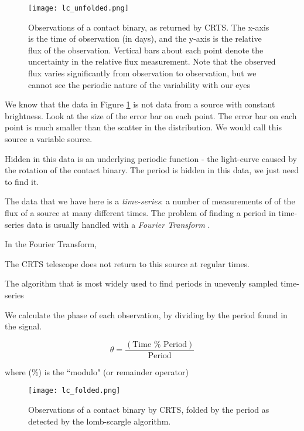 \documentclass[12pt]{article} %
\numberwithin{equation}{section} %
\begin{document}
\begin{figure}[H]
\centering
\texttt{[image: lc\_unfolded.png]}
\caption{Observations of a contact binary, as returned by CRTS. The x-axis is the time of observation (in days), and the y-axis is the relative flux of the observation. Vertical bars about each point denote the uncertainty in the relative flux measurement. Note that the observed flux varies significantly from observation to observation, but we cannot see the periodic nature of the variability with our eyes}
\label{fig: lc_unfolded}
\end{figure}

We know that the data in Figure \ref{fig: lc_unfolded} is not data from a source with constant brightness. Look at the size of the error bar on each point. The error bar on each point is much smaller than the scatter in the distribution. We would call this source a variable source.


Hidden in this data is an underlying periodic function - the light-curve caused by the rotation of the contact binary. The period is hidden in this data, we just need to find it.

The data that we have here is a \emph{time-series}: a number of measurements of of the flux of a source at many different times. The problem of finding a period in time-series data is usually handled with a \emph{Fourier Transform} .

In the Fourier Transform, 

The CRTS telescope does not return to this source at regular times.

The algorithm that is most widely used to find periods in unevenly sampled time-series \citet{scargle1982studies}

We calculate the phase of each observation, by dividing by the period found in the signal.

\begin{equation} \label{phase_fold}
\theta = \frac{(\text{Time } \% \text{ Period})}{\text{Period}}
\end{equation}

where (\%) is the ``modulo" (or remainder operator)

\begin{figure}[H]
\centering
\texttt{[image: lc\_folded.png]}
\caption{Observations of a contact binary by CRTS, folded by the period as detected by the lomb-scargle algorithm.}
\label{fig: lc_folded}
\end{figure}
\end{document}
